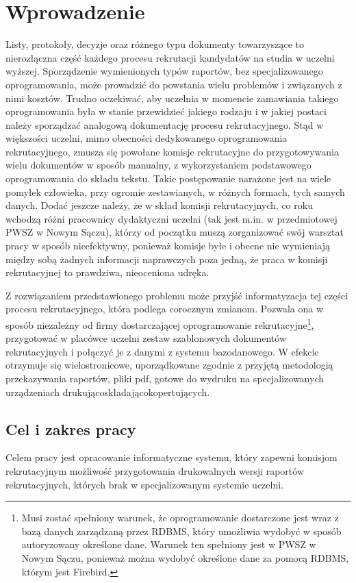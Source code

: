 \chapter{Wprowadzenie}

Listy, protokoły, decyzje oraz różnego typu dokumenty towarzyszące to nierozłączna część każdego procesu rekrutacji kandydatów na studia w uczelni wyższej. Sporządzenie wymienionych typów raportów, bez specjalizowanego oprogramowania, może prowadzić do powstania wielu problemów i związanych z nimi kosztów.  Trudno oczekiwać, aby uczelnia w momencie zamawiania takiego oprogramowania była w stanie przewidzieć jakiego rodzaju i w jakiej postaci należy sporządzać analogową dokumentację procesu rekrutacyjnego. Stąd w większości uczelni, mimo obecności dedykowanego oprogramowania rekrutacyjnego, zmusza się powołane komisje rekrutacyjne do przygotowywania wielu dokumentów w sposób manualny, z wykorzystaniem podstawowego oprogramowania do składu tekstu. Takie postępowanie narażone jest na wiele pomyłek człowieka, przy ogromie zestawianych, w różnych formach, tych samych danych.  Dodać jeszcze należy, że w skład komisji rekrutacyjnych, co roku wchodzą różni pracownicy dydaktyczni uczelni (tak jest m.in. w przedmiotowej PWSZ w Nowym Sączu), którzy od początku muszą zorganizować swój warsztat pracy w sposób nieefektywny, ponieważ komisje byłe i obecne nie wymieniają między sobą żadnych informacji naprawczych poza jedną, że praca w komisji rekrutacyjnej to prawdziwa, nieoceniona udręka.


Z rozwiązaniem przedstawionego problemu może przyjść  informatyzacja tej części procesu rekrutacyjnego, która podlega corocznym zmianom. Pozwala ona w sposób niezależny od firmy dostarczającej oprogramowanie rekrutacyjne\footnote{Musi zostać spełniony warunek, że oprogramowanie dostarczone jest wraz z bazą danych zarządzaną przez RDBMS, który umożliwia wydobyć w sposób autoryzowany określone dane. Warunek ten spełniony jest w PWSZ w Nowym Sączu, ponieważ można wydobyć określone dane za pomocą RDBMS, którym jest Firebird.}, przygotować w placówce uczelni zestaw szablonowych dokumentów rekrutacyjnych i połączyć je z danymi z systemu bazodanowego. W efekcie otrzymuje się wielostronicowe, uporządkowane zgodnie z przyjętą metodologią przekazywania raportów, pliki pdf, gotowe do wydruku na specjalizowanych urządzeniach drukująco\dywiz składająco\dywiz  kopertujących.


\section{Cel i zakres pracy}
Celem pracy jest opracowanie informatyczne systemu, który zapewni komisjom rekrutacyjnym możliwość przygotowania drukowalnych wersji raportów  rekrutacyjnych, których brak w specjalizowanym systemie uczelni. 

